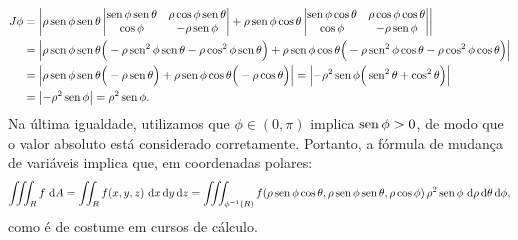 \documentclass[../livro.tex]{subfiles}  %
\begin{document}
\begin{equation}
\begin{split}
J\phi & = \left| \rho \operatorname{sen} \phi \operatorname{sen} \theta
\left| 
\begin{matrix}
\operatorname{sen} \phi \operatorname{sen} \theta     & \rho \cos \phi \operatorname{sen} \theta  \\
\cos \phi                 &    -\rho \operatorname{sen} \phi  \\
\end{matrix}
\right| + \rho \operatorname{sen} \phi \cos \theta
\left| 
\begin{matrix}
\operatorname{sen} \phi \cos \theta      & \rho \cos \phi \cos \theta \\
\cos \phi                  &    -\rho \operatorname{sen} \phi  \\
\end{matrix}
\right| \right|  \\
& = \left| \rho \operatorname{sen} \phi \operatorname{sen} \theta \Big(- \rho \operatorname{sen}^2 \phi \operatorname{sen} \theta - \rho \cos^2 \phi \operatorname{sen} \theta \Big)  + \rho \operatorname{sen} \phi \cos \theta \Big(- \rho \operatorname{sen}^2 \phi \cos \theta - \rho \cos^2 \phi \cos \theta \Big) \right|  \\
& =  \left| \rho \operatorname{sen} \phi \operatorname{sen} \theta \Big (- \rho \operatorname{sen} \theta \Big) + \rho \operatorname{sen} \phi \cos \theta \Big(- \rho \cos \theta \Big) \right|  = \left|  - \rho^2 \operatorname{sen} \phi \Big( \operatorname{sen}^2 \theta + \cos^2 \theta \Big) \right| \\
& = \left| - \rho^2 \operatorname{sen} \phi \right| = \rho^2 \operatorname{sen} \phi.
\end{split}
\end{equation}
Na última igualdade, utilizamos que $\phi \in (0,\pi)$ implica $\operatorname{sen} \phi > 0$, de modo que o valor absoluto está considerado corretamente. Portanto, a fórmula de mudança de variáveis implica que, em coordenadas polares:
\begin{equation}
\iiint_R f \, \, \mathrm{d} A = \iint_R f(x,y, z) \, \, \mathrm{d} x \, \mathrm{d} y \, \mathrm{d} z = \iiint_{\phi^{-1}(R)} f(\rho \operatorname{sen} \phi \cos \theta, \rho \operatorname{sen} \phi \operatorname{sen} \theta, \rho \cos \phi) \, \rho^2 \operatorname{sen} \phi \, \, \mathrm{d} \rho \, \mathrm{d} \theta \, \mathrm{d} \phi,
\end{equation} como é de costume em cursos de cálculo.
\end{document}
